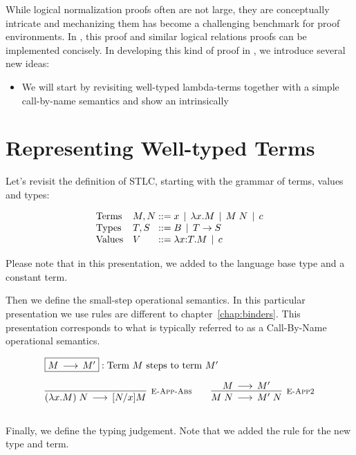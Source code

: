 While logical normalization proofs often are not large, they are
conceptually intricate and mechanizing them has become a challenging
benchmark for proof environments. In \beluga, this proof and similar
logical relations proofs can be implemented concisely. In developing
this kind of proof in \beluga, we introduce several new ideas:

\begin{itemize}
\item We will start by revisiting well-typed lambda-terms together with a
simple call-by-name semantics and show an intrinsically 
\end{itemize}





\section{Representing Well-typed Terms}

Let's revisit the definition of STLC, starting with the grammar of terms, values and types:

\[
\begin{array}{ll@{\bnfas}l}
\mbox{Terms} & M, N & x \bnfalt \lam x.M \bnfalt M \app N \bnfalt c\\
\mbox{Types} & T, S & B \bnfalt T \arrow S\\
\mbox{Values} & V & \lam x{:}T.M \bnfalt c
\end{array}
\]

Please note that in this presentation, we added to the language base
type and a constant term.

Then we define the small-step operational semantics. In this
particular presentation we use rules are different to
chapter~\ref{chap:binders}. This presentation corresponds to what is
typically referred to as a Call-By-Name operational semantics.

\[
\begin{array}{c}
\multicolumn{1}{l}{\fbox{$M \Steps M'$}: \mbox{Term $M$ steps to term $M'$}}
\\[1em]
\infer[\EAppBeta]{(\lam x.M) \app N \Steps [N/x]M}{} \qquad
\infer[\EAppArgStep]{M \app N \Steps M'\;N}{M \Steps M'} \\[1em]
\end{array}
\]

Finally, we define the typing judgement. Note that we added the rule
\TBase for the new type and term.

